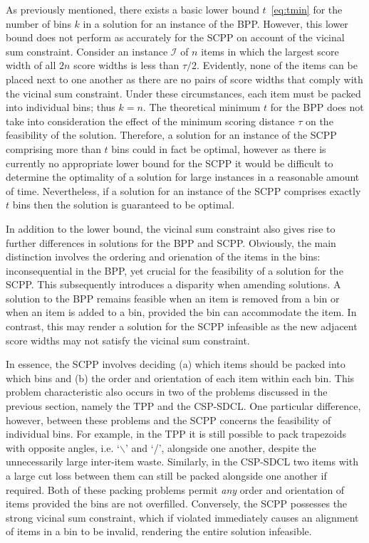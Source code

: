 \documentclass[a4paper,11pt]{article}
\begin{document}
As previously mentioned, there exists a basic lower bound $t$~\eqref{eq:tmin} for the number of bins $k$ in a solution for an instance of the BPP. However, this lower bound does not perform as accurately for the SCPP on account of the vicinal sum constraint. Consider an instance $\mathcal{I}$ of $n$ items in which the largest score width of all $2n$ score widths is less than $\tau/2$. Evidently, none of the items can be placed next to one another as there are no pairs of score widths that comply with the vicinal sum constraint. Under these circumstances, each item must be packed into individual bins; thus $k = n$. The theoretical minimum $t$ for the BPP does not take into consideration the effect of the minimum scoring distance $\tau$ on the feasibility of the solution. Therefore, a solution for an instance of the SCPP comprising more than $t$ bins could in fact be optimal, however as there is currently no appropriate lower bound for the SCPP it would be difficult to determine the optimality of a solution for large instances in a reasonable amount of time. Nevertheless, if a solution for an instance of the SCPP comprises exactly $t$ bins then the solution is guaranteed to be optimal.

In addition to the lower bound, the vicinal sum constraint also gives rise to further differences in solutions for the BPP and SCPP. Obviously, the main distinction involves the ordering and orienation of the items in the bins: inconsequential in the BPP, yet crucial for the feasibility of a solution for the SCPP. This subsequently introduces a disparity when amending solutions. A solution to the BPP remains feasible when an item is removed from a bin or when an item is added to a bin, provided the bin can accommodate the item. In contrast, this may render a solution for the SCPP infeasible as the new adjacent score widths may not satisfy the vicinal sum constraint.

In essence, the SCPP involves deciding (a) which items should be packed into which bins and (b) the order and orientation of each item within each bin. This problem characteristic also occurs in two of the problems discussed in the previous section, namely the TPP and the CSP-SDCL. One particular difference, however, between these problems and the SCPP concerns the feasibility of individual bins. For example, in the TPP it is still possible to pack trapezoids with opposite angles, i.e. `$\backslash$' and `/', alongside one another, despite the unnecessarily large inter-item waste. Similarly, in the CSP-SDCL two items with a large cut loss between them can still be packed alongside one another if required. Both of these packing problems permit \emph{any} order and orientation of items provided the bins are not overfilled. Conversely, the SCPP possesses the strong vicinal sum constraint, which if violated immediately causes an alignment of items in a bin to be invalid, rendering the entire solution infeasible.
\end{document}

